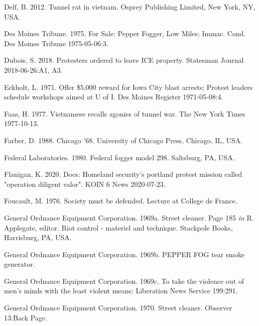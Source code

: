 \documentclass[
  11pt,
]{krantz}
\newlength{\cslhangindent}
\newenvironment{CSLReferences}[2] %
 {%
  \setlength{\parindent}{0pt}
  \ifodd #1 \everypar{\setlength{\hangindent}{\cslhangindent}}\ignorespaces\fi
  \ifnum #2 > 0
  \setlength{\parskip}{#2\baselineskip}
  \fi
 }%
 {}
\begin{document}
\begin{CSLReferences}{1}{0}
\leavevmode{}%
Delf, B. 2012. Tunnel rat in vietnam. Osprey Publishing Limited, New York, NY, USA.

\leavevmode{}%
Des Moines Tribune. 1975. {For Sale: Pepper Fogger, Low Miles; Immac. Cond.} Des Moines Tribune 1975-05-06:3.

\leavevmode{}%
Dubois, S. 2018. Protesters ordered to leave ICE property. Statesman Journal 2018-06-26:A1, A3.

\leavevmode{}%
Eckholt, L. 1971. {Offer \$5,000 reward for Iowa City blast arrests; Protest leaders schedule workshops aimed at U of I}. Des Moines Register 1971-05-08:4.

\leavevmode{}%
Faas, H. 1977. Vietnamese recalls agonies of tunnel war. The New York Times 1977-10-13.

\leavevmode{}%
Farber, D. 1988. Chicago '68. University of Chicago Press, Chicago, IL, USA.

\leavevmode{}%
Federal Laboratories. 1980. Federal fogger model 298. Saltsburg, PA, USA.

\leavevmode{}%
Flanigan, K. 2020. Docs: Homeland security's portland protest mission called "operation diligent valor". KOIN 6 News 2020-07-23.

\leavevmode{}%
Foucault, M. 1976. Society must be defended. Lecture at College de France.

\leavevmode{}%
General Ordnance Equipment Corporation. 1969a. Street cleaner. Page 185 \emph{in} R. Applegate, editor. Riot control - materiel and technique. Stackpole Books, Harrisburg, PA, USA.

\leavevmode{}%
General Ordnance Equipment Corporation. 1969b. PEPPER FOG tear smoke generator.

\leavevmode{}%
General Ordnance Equipment Corporation. 1969c. To take the violence out of men's minds with the least violent means: Liberation News Service 199:291.

\leavevmode{}%
General Ordnance Equipment Corporation. 1970. Street cleaner. Observer 13:Back Page.


\end{CSLReferences}
\end{document}
